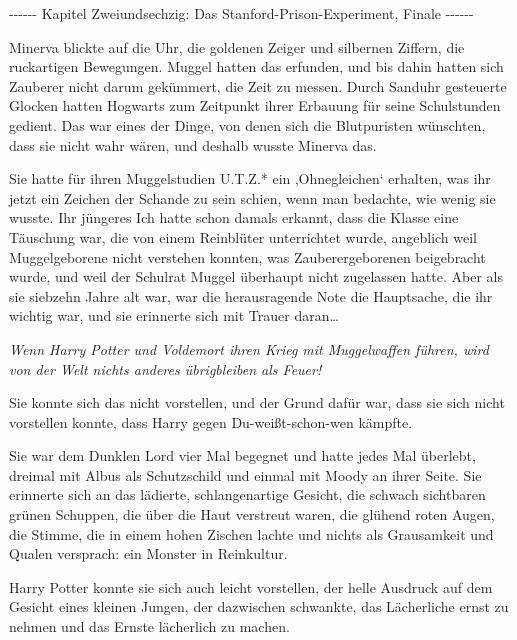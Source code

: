

\hypertarget{das-stanford-prison-experiment-finale}{%

-\/-\/-\/-\/-\/- Kapitel Zweiundsechzig: Das Stanford-Prison-Experiment, Finale -\/-\/-\/-\/-\/-

Minerva blickte auf die Uhr, die goldenen Zeiger und silbernen Ziffern, die ruckartigen Bewegungen. Muggel hatten das erfunden, und bis dahin hatten sich Zauberer nicht darum gekümmert, die Zeit zu messen. Durch Sanduhr gesteuerte Glocken hatten Hogwarts zum Zeitpunkt ihrer Erbauung für seine Schulstunden gedient. Das war eines der Dinge, von denen sich die Blutpuristen wünschten, dass sie nicht wahr wären, und deshalb wusste Minerva das.

Sie hatte für ihren Muggelstudien U.T.Z.* ein ‚Ohnegleichen` erhalten, was ihr jetzt ein Zeichen der Schande zu sein schien, wenn man bedachte, wie wenig sie wusste. Ihr jüngeres Ich hatte schon damals erkannt, dass die Klasse eine Täuschung war, die von einem Reinblüter unterrichtet wurde, angeblich weil Muggelgeborene nicht verstehen konnten, was Zauberergeborenen beigebracht wurde, und weil der Schulrat Muggel überhaupt nicht zugelassen hatte. Aber als sie siebzehn Jahre alt war, war die herausragende Note die Hauptsache, die ihr wichtig war, und sie erinnerte sich mit Trauer daran…

\emph{\emph{Wenn Harry Potter und Voldemort ihren Krieg mit Muggelwaffen führen, wird von der Welt nichts anderes übrigbleiben als Feuer!}}

Sie konnte sich das nicht vorstellen, und der Grund dafür war, dass sie sich nicht vorstellen konnte, dass Harry gegen Du-weißt-schon-wen kämpfte.

Sie war dem Dunklen Lord vier Mal begegnet und hatte jedes Mal überlebt, dreimal mit Albus als Schutzschild und einmal mit Moody an ihrer Seite. Sie erinnerte sich an das lädierte, schlangenartige Gesicht, die schwach sichtbaren grünen Schuppen, die über die Haut verstreut waren, die glühend roten Augen, die Stimme, die in einem hohen Zischen lachte und nichts als Grausamkeit und Qualen versprach: ein Monster in Reinkultur.

Harry Potter konnte sie sich auch leicht vorstellen, der helle Ausdruck auf dem Gesicht eines kleinen Jungen, der dazwischen schwankte, das Lächerliche ernst zu nehmen und das Ernste lächerlich zu machen.

}
